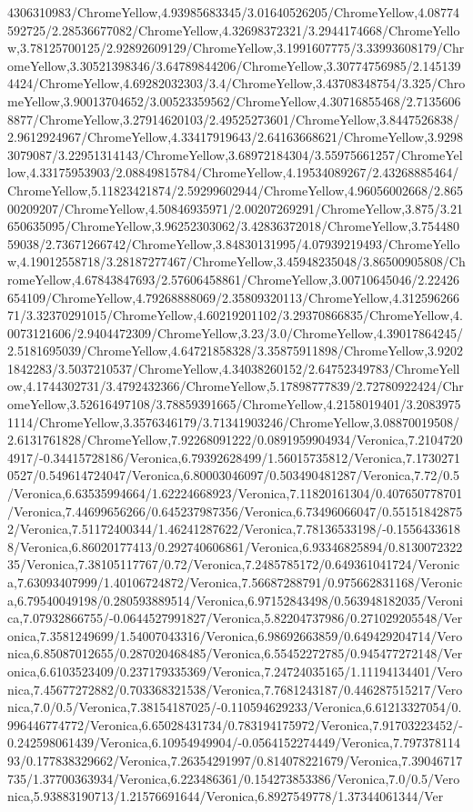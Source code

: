 {\begin{tikzternal}
4306310983/ChromeYellow,4.93985683345/3.01640526205/ChromeYellow,4.08774592725/2.28536677082/ChromeYellow,4.32698372321/3.2944174668/ChromeYellow,3.78125700125/2.92892609129/ChromeYellow,3.1991607775/3.33993608179/ChromeYellow,3.30521398346/3.64789844206/ChromeYellow,3.30774756985/2.1451394424/ChromeYellow,4.69282032303/3.4/ChromeYellow,3.43708348754/3.325/ChromeYellow,3.90013704652/3.00523359562/ChromeYellow,4.30716855468/2.71356068877/ChromeYellow,3.27914620103/2.49525273601/ChromeYellow,3.8447526838/2.9612924967/ChromeYellow,4.33417919643/2.64163668621/ChromeYellow,3.92983079087/3.22951314143/ChromeYellow,3.68972184304/3.55975661257/ChromeYellow,4.33175953903/2.08849815784/ChromeYellow,4.19534089267/2.43268885464/ChromeYellow,5.11823421874/2.59299602944/ChromeYellow,4.96056002668/2.86500209207/ChromeYellow,4.50846935971/2.00207269291/ChromeYellow,3.875/3.21650635095/ChromeYellow,3.96252303062/3.42836372018/ChromeYellow,3.75448059038/2.73671266742/ChromeYellow,3.84830131995/4.07939219493/ChromeYellow,4.19012558718/3.28187277467/ChromeYellow,3.45948235048/3.86500905808/ChromeYellow,4.67843847693/2.57606458861/ChromeYellow,3.00710645046/2.22426654109/ChromeYellow,4.79268888069/2.35809320113/ChromeYellow,4.31259626671/3.32370291015/ChromeYellow,4.60219201102/3.29370866835/ChromeYellow,4.0073121606/2.9404472309/ChromeYellow,3.23/3.0/ChromeYellow,4.39017864245/2.5181695039/ChromeYellow,4.64721858328/3.35875911898/ChromeYellow,3.92021842283/3.5037210537/ChromeYellow,4.34038260152/2.64752349783/ChromeYellow,4.1744302731/3.4792432366/ChromeYellow,5.17898777839/2.72780922424/ChromeYellow,3.52616497108/3.78859391665/ChromeYellow,4.2158019401/3.20839751114/ChromeYellow,3.3576346179/3.71341903246/ChromeYellow,3.08870019508/2.6131761828/ChromeYellow,7.92268091222/0.0891959904934/Veronica,7.21047204917/-0.34415728186/Veronica,6.79392628499/1.56015735812/Veronica,7.17302710527/0.549614724047/Veronica,6.80003046097/0.503490481287/Veronica,7.72/0.5/Veronica,6.63535994664/1.62224668923/Veronica,7.11820161304/0.407650778701/Veronica,7.44699656266/0.645237987356/Veronica,6.73496066047/0.551518428752/Veronica,7.51172400344/1.46241287622/Veronica,7.78136533198/-0.15564336188/Veronica,6.86020177413/0.292740606861/Veronica,6.93346825894/0.813007232235/Veronica,7.38105117767/0.72/Veronica,7.2485785172/0.649361041724/Veronica,7.63093407999/1.40106724872/Veronica,7.56687288791/0.975662831168/Veronica,6.79540049198/0.280593889514/Veronica,6.97152843498/0.563948182035/Veronica,7.07932866755/-0.0644527991827/Veronica,5.82204737986/0.271029205548/Veronica,7.3581249699/1.54007043316/Veronica,6.98692663859/0.649429204714/Veronica,6.85087012655/0.287020468485/Veronica,6.55452272785/0.945477272148/Veronica,6.6103523409/0.237179335369/Veronica,7.24724035165/1.11194134401/Veronica,7.45677272882/0.703368321538/Veronica,7.7681243187/0.446287515217/Veronica,7.0/0.5/Veronica,7.38154187025/-0.110594629233/Veronica,6.61213327054/0.996446774772/Veronica,6.65028431734/0.783194175972/Veronica,7.91703223452/-0.242598061439/Veronica,6.10954949904/-0.0564152274449/Veronica,7.79737811493/0.177838329662/Veronica,7.26354291997/0.814078221679/Veronica,7.39046717735/1.37700363934/Veronica,6.223486361/0.154273853386/Veronica,7.0/0.5/Veronica,5.93883190713/1.21576691644/Veronica,6.8927549778/1.37344061344/Ver
\end{tikzternal}}
